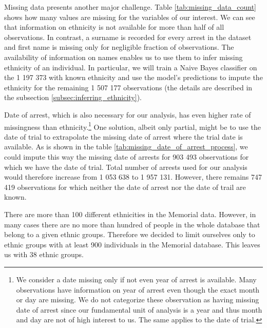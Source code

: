 Missing data presents another major challenge. 
 Table \ref{tab:missing_data_count} shows how many values are missing for the variables of our interest. We can see that information on ethnicity is not available for more than half of all observations. In contrast, a surname is recorded for every arrest in the dataset and first name is missing only for negligible fraction of observations. The availability of information on names enables us to use them to infer missing ethnicity of an individual. In particular, we will train a Naive Bayes classifier on the 1 197 373 with known ethnicity and use the model's predictions to impute the ethnicity for the remaining 1 507 177 observations (the details are described in the subsection \ref{subsec:inferring_ethnicity}).


Date of arrest, which is also necessary for our analysis, has even higher rate of missingness than ethnicity.\footnote{
We consider a date missing only if not even year of arrest is available. Many observations have information on year of arrest even though the exact month or day are missing. We do not categorize these observation as having missing date of arrest since our fundamental unit of analysis is a year and thus month and day are not of high interest to us. The same applies to the date of trial.} 
One solution, albeit only partial, might be to use the date of trial    to extrapolate the missing date of arrest where the trial date is available.
As is shown in the table \ref{tab:missing_date_of_arrest_process}, we could impute this way the missing date of arrests for 903 493 observations for which we have the date of trial. 
Total number of arrests used for our analysis would therefore increase from 1 053 638 to  1 957 131.  However, there remains 747 419 observations for which neither the date of arrest nor the date of trail are known. 

%

There are more than 100 different ethnicities in the Memorial data. 
However, in many cases there are no more than hundred of people in the whole database that belong to a given ethnic groups. 
Therefore we decided to limit ourselves only to ethnic groups with at least 900 individuals in the Memorial database. 
This leaves us with 38 ethnic groups. 


